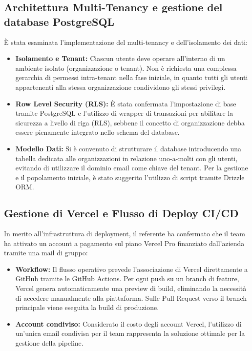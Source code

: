 \subsection{Architettura Multi-Tenancy e gestione del database PostgreSQL}
È stata esaminata l'implementazione del multi-tenancy e dell'isolamento dei dati:
\begin{itemize}
    \item \textbf{Isolamento e Tenant:} Ciascun utente deve operare all'interno di un ambiente isolato (organizzazione o tenant). Non è richiesta una complessa gerarchia di permessi intra-tenant nella fase iniziale, in quanto tutti gli utenti appartenenti alla stessa organizzazione condividono gli stessi privilegi.
    \item \textbf{Row Level Security (RLS):} È stata confermata l'impostazione di base tramite PostgreSQL e l'utilizzo di wrapper di transazioni per abilitare la sicurezza a livello di riga (RLS), sebbene il concetto di organizzazione debba essere pienamente integrato nello schema del database.
    \item \textbf{Modello Dati:} Si è convenuto di strutturare il database introducendo una tabella dedicata alle organizzazioni in relazione uno-a-molti con gli utenti, evitando di utilizzare il dominio email come chiave del tenant. Per la gestione e il popolamento iniziale, è stato suggerito l'utilizzo di script tramite Drizzle ORM.
\end{itemize}
\subsection{Gestione di Vercel e Flusso di Deploy CI/CD}
In merito all'infrastruttura di deployment, il referente ha confermato che il team ha attivato un account a pagamento sul piano Vercel Pro finanziato dall'azienda tramite una mail di gruppo:
\begin{itemize}
    \item \textbf{Workflow:} Il flusso operativo prevede l'associazione di Vercel direttamente a GitHub tramite le GitHub Actions. Per ogni push su un branch di feature, Vercel genera automaticamente una preview di build, eliminando la necessità di accedere manualmente alla piattaforma. Sulle Pull Request verso il branch principale viene eseguita la build di produzione.
    \item \textbf{Account condiviso:} Considerato il costo degli account Vercel, l'utilizzo di un'unica email condivisa per il team rappresenta la soluzione ottimale per la gestione della pipeline.
\end{itemize}
